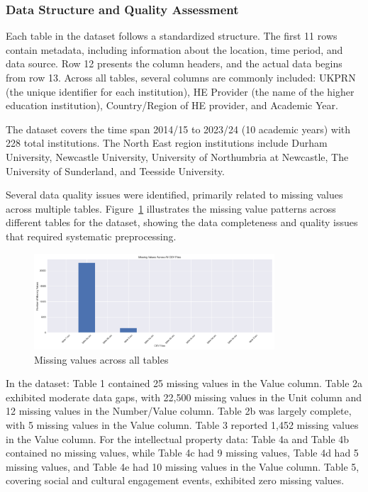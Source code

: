 \documentclass[journal,onecolumn, 10pt,draftclsnofoot]{IEEEtran}
\begin{document}
\subsubsection{Data Structure and Quality Assessment}
Each table in the dataset follows a standardized structure. The first 11 rows contain metadata, including information about the location, time period, and data source. Row 12 presents the column headers, and the actual data begins from row 13. Across all tables, several columns are commonly included: UKPRN (the unique identifier for each institution), HE Provider (the name of the higher education institution), Country/Region of HE provider, and Academic Year.

The dataset covers the time span 2014/15 to 2023/24 (10 academic years) with 228 total institutions. The North East region institutions include Durham University, Newcastle University, University of Northumbria at Newcastle, The University of Sunderland, and Teesside University.

Several data quality issues were identified, primarily related to missing values across multiple tables. Figure~\ref{fig:missing-values} illustrates the missing value patterns across different tables for the dataset, showing the data completeness and quality issues that required systematic preprocessing.

\begin{figure}[h]
\centering
\includegraphics[width=0.8\textwidth]{Fig/figure1.missing_values_comparison.png}
\caption{Missing values across all tables}
\label{fig:missing-values}
\end{figure}

In the dataset: Table 1 contained 25 missing values in the Value column. Table 2a exhibited moderate data gaps, with 22,500 missing values in the Unit column and 12 missing values in the Number/Value column. Table 2b was largely complete, with 5 missing values in the Value column. Table 3 reported 1,452 missing values in the Value column. For the intellectual property data: Table 4a and Table 4b contained no missing values, while Table 4c had 9 missing values, Table 4d had 5 missing values, and Table 4e had 10 missing values in the Value column. Table 5, covering social and cultural engagement events, exhibited zero missing values.
\end{document}
